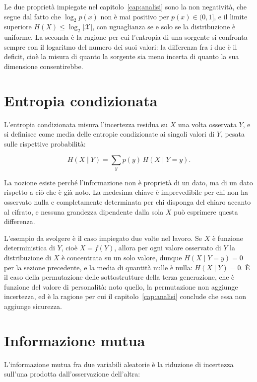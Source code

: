 Le due proprietà impiegate nel capitolo~\ref{cap:analisi} sono la non negatività, che segue dal fatto che $\log_2 p(x)$ non è mai positivo per $p(x) \in (0,1]$, e il limite superiore $H(X) \le \log_2 |\mathcal{X}|$, con uguaglianza se e solo se la distribuzione è uniforme. La seconda è la ragione per cui l'entropia di una sorgente si confronta sempre con il logaritmo del numero dei suoi valori: la differenza fra i due è il deficit, cioè la misura di quanto la sorgente sia meno incerta di quanto la sua dimensione consentirebbe.

\section{Entropia condizionata}

L'entropia condizionata misura l'incertezza residua su $X$ una volta osservata $Y$, e si definisce come media delle entropie condizionate ai singoli valori di $Y$, pesata sulle rispettive probabilità:

\begin{equation}
H(X \mid Y) = \sum_{y} p(y)\, H(X \mid Y = y).
\end{equation}

La nozione esiste perché l'informazione non è proprietà di un dato, ma di un dato rispetto a ciò che è già noto. La medesima chiave è imprevedibile per chi non ha osservato nulla e completamente determinata per chi disponga del chiaro accanto al cifrato, e nessuna grandezza dipendente dalla sola $X$ può esprimere questa differenza.

L'esempio da svolgere è il caso impiegato due volte nel lavoro. Se $X$ è funzione deterministica di $Y$, cioè $X = f(Y)$, allora per ogni valore osservato di $Y$ la distribuzione di $X$ è concentrata su un solo valore, dunque $H(X \mid Y = y) = 0$ per la sezione precedente, e la media di quantità nulle è nulla: $H(X \mid Y) = 0$. È il caso della permutazione delle sottostrutture della terza generazione, che è funzione del valore di personalità: noto quello, la permutazione non aggiunge incertezza, ed è la ragione per cui il capitolo~\ref{cap:analisi} conclude che essa non aggiunge sicurezza.

\section{Informazione mutua}

L'informazione mutua fra due variabili aleatorie è la riduzione di incertezza sull'una prodotta dall'osservazione dell'altra:

